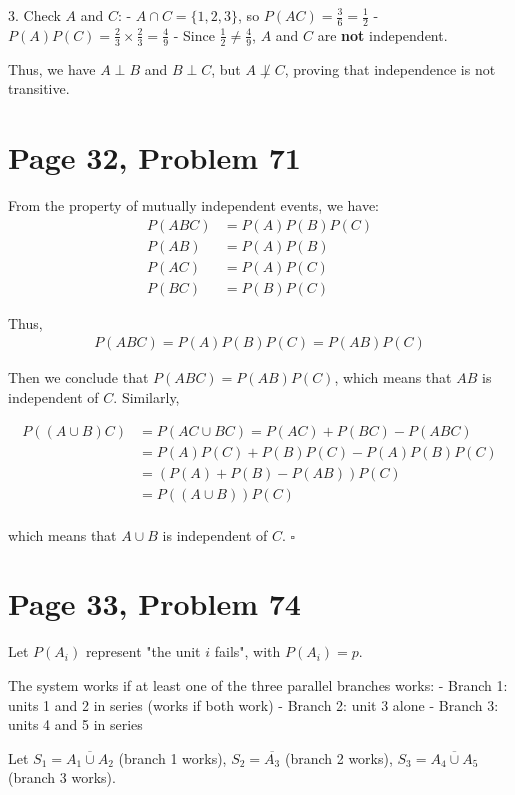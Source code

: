 \documentclass[a4paper, UTF-8]{article}
\theoremstyle{plain}
\begin{document}
3. Check $A$ and $C$:
   - $A \cap C = \{1, 2, 3\}$, so $P(AC) = \frac{3}{6} = \frac{1}{2}$
   - $P(A)P(C) = \frac{2}{3} \times \frac{2}{3} = \frac{4}{9}$
   - Since $\frac{1}{2} \neq \frac{4}{9}$, $A$ and $C$ are \textbf{not} independent.

Thus, we have $A \perp B$ and $B \perp C$, but $A \not\perp C$, proving that independence is not transitive.

\section{Page 32, Problem 71}

From the property of mutually independent events, we have:
\begin{align*}
P(ABC) &= P(A)P(B)P(C) \\
P(AB) &= P(A)P(B) \\
P(AC) &= P(A)P(C) \\
P(BC) &= P(B)P(C)
\end{align*}

Thus, 
\begin{align*}
P(ABC) = P(A)P(B)P(C) = P(AB)P(C)
\end{align*}

Then we conclude that $P(ABC) = P(AB)P(C)$, which means that $AB$ is independent of $C$. Similarly, 

\begin{align*} 
P((A \cup B)C) &= P(AC \cup BC) = P(AC) + P(BC) - P(ABC)\\ 
               &= P(A)P(C) + P(B)P(C) - P(A)P(B)P(C)\\ 
               &= (P(A)+P(B)-P(AB))P(C) \\
               &= P((A \cup B))P(C)\\
\end{align*}

which means that $A \cup B$ is independent of $C$. $\square$

\section{Page 33, Problem 74}

Let $P(A_i)$ represent "the unit $i$ fails", with $P(A_i) = p$.

The system works if at least one of the three parallel branches works:
- Branch 1: units 1 and 2 in series (works if both work)
- Branch 2: unit 3 alone
- Branch 3: units 4 and 5 in series

Let $S_1 = \overline{A_1 \cup A_2}$ (branch 1 works), $S_2 = \overline{A_3}$ (branch 2 works), $S_3 = \overline{A_4 \cup A_5}$ (branch 3 works).
\end{document}
